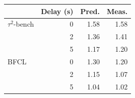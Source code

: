 \centering\footnotesize\setlength{\tabcolsep}{3pt}
\captionsetup{type=table}
\caption{\textbf{Tool-delay speedups.} Qwen3, trained 0.6B, $k=2$.}
\label{tab:tool}
\begin{tabular}{lrrr}
\toprule
 & Delay (s) & Pred. & Meas. \\
\midrule
$\tau^2$-bench & 0 & 1.58 & 1.58 \\
               & 2 & 1.36 & 1.41 \\
               & 5 & 1.17 & 1.20 \\
\midrule
BFCL           & 0 & 1.30 & 1.20 \\
               & 2 & 1.15 & 1.07 \\
               & 5 & 1.04 & 1.02 \\
\bottomrule
\end{tabular}

